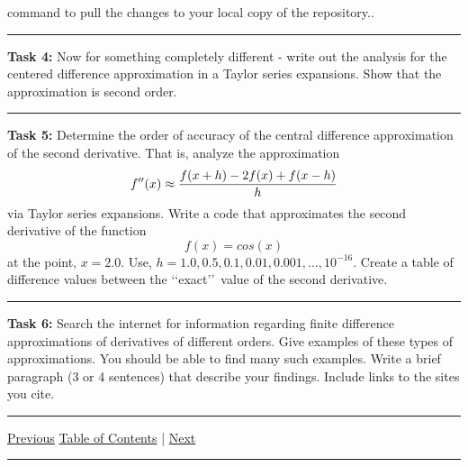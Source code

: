 \documentclass[10pt,fleqn]{article}
\begin{document}
\begin{trivlist}
\begin{verbatim}
        \end{verbatim}
        command to pull the changes to your local copy of the repository..
\vskip0.1in\hrule\vskip0.1in \noindent
  \item[\bf Task 4:] Now for something completely different - write out the
        analysis for the centered difference approximation in a Taylor series
        expansions. Show that the approximation is second order.
\vskip0.1in\hrule\vskip0.1in \noindent
  \item[\bf Task 5:] Determine the order of accuracy of the central difference
        approximation of the second derivative. That is, analyze the
        approximation
        \[
          f''(x) \approx {{f(x+h) - 2 f(x) + f(x-h)}\over{h}}
        \]
        via Taylor series expansions. Write a code that approximates the second
        derivative of the function
        \[
          f(x) = cos(x)
        \] 
        at the point, \(x=2.0\). Use,
        \(h=1.0,0.5,0.1,0.01,0.001,\ldots,10^{-16}\). Create a table of
        difference values between the \lq\lq exact\rq\rq\ value of the second
        derivative.
\vskip0.1in\hrule\vskip0.1in \noindent
  \item[\bf Task 6:] Search the internet for information regarding finite
        difference approximations of derivatives of different orders. Give
        examples of these types of approximations. You should be able to find
        many such examples. Write a brief paragraph (3 or 4 sentences) that
        describe your findings. Include links to the sites you cite.
\end{trivlist}
\vskip0.1in\hrule\vskip0.1in \noindent
  \href{../../tasksheet_01/html/tasksheet_01.html}{Previous}
  \href{../../toc/md/tasksheet_toc.md}{Table of Contents} |
  \href{../../tasksheet_03/html/tasksheet_03.html}{Next}
\vskip0.1in\hrule\vskip0.1in \noindent
\end{document}
